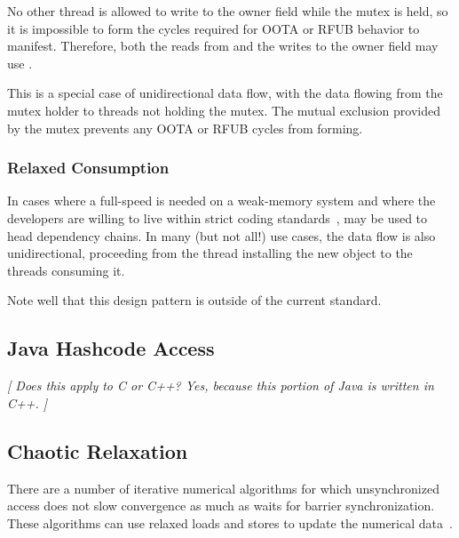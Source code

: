 \documentclass[10]{article}
\begin{document}
No other thread is allowed to write to the owner field while the mutex
is held, so it is impossible to form the cycles required for OOTA or
RFUB behavior to manifest.
Therefore, both the reads from and the writes to the owner field
may use .

This is a special case of unidirectional data flow, with the data flowing
from the mutex holder to threads not holding the mutex.
The mutual exclusion provided by the mutex prevents any OOTA or RFUB
cycles from forming.


\subsubsection{Relaxed Consumption}
\label{sec:Relaxed Consumption}

In cases where a full-speed  is needed on a
weak-memory system and where the developers are willing to live within
strict coding standards~\cite{PaulEMcKenney2014rcu-dereference},
 may be used to head dependency chains.
In many (but not all!) use cases, the data flow is also unidirectional,
proceeding from the thread installing the new object to the threads
consuming it.

Note well that this design pattern is outside of the current standard.

\subsection{Java Hashcode Access}
\label{sec:Java Hashcode Access}

\emph{[ Does this apply to C or C++?
Yes, because this portion of Java is written in C++. ]}

\subsection{Chaotic Relaxation}
\label{sec:Chaotic Relaxation}

There are a number of iterative numerical algorithms for which unsynchronized
access does not slow convergence as much as waits for barrier synchronization.
These algorithms can use relaxed loads and stores to update the numerical
data~\cite{Andrews91textbook}.
\end{document}
